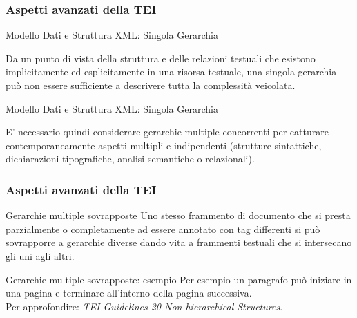     \begin{frame}
        \frametitle{Aspetti avanzati della TEI}
        \addtocounter{nframe}{1}
        
    
        \begin{block}{Modello Dati e Struttura XML: Singola Gerarchia}
            
            Da un punto di vista della struttura e delle relazioni testuali che esistono implicitamente ed esplicitamente in una risorsa testuale, una singola gerarchia può non essere sufficiente a descrivere tutta la complessità veicolata. 
            
           
        \end{block}

        \begin{block}{Modello Dati e Struttura XML: Singola Gerarchia}

            E' necessario quindi considerare gerarchie multiple concorrenti per catturare contemporaneamente aspetti multipli e indipendenti (strutture sintattiche, dichiarazioni tipografiche, analisi semantiche o relazionali).

        \end{block}
        
    \end{frame}


    \begin{frame}
        \frametitle{Aspetti avanzati della TEI}
        \addtocounter{nframe}{1}
        
    
        \begin{block}{Gerarchie multiple sovrapposte}
            Uno stesso frammento di documento che si presta parzialmente o completamente ad essere annotato con tag differenti si può sovrapporre a gerarchie diverse dando vita a frammenti testuali che si intersecano gli uni agli altri.
        \end{block}

        \begin{block}{Gerarchie multiple sovrapposte: esempio}
            Per esempio un paragrafo può iniziare in una pagina e terminare all’interno della pagina successiva.
            \\ Per approfondire: \textit{TEI Guidelines 20 Non-hierarchical Structures}.
        \end{block}
        
    \end{frame}



